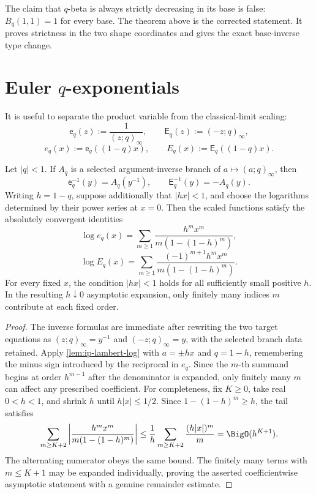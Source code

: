 \begin{warning}
The claim that \(q\)-beta is always strictly decreasing in its base is false:
\(B_q(1,1)=1\) for every base.  The theorem above is the corrected statement.
It proves strictness in the two shape coordinates and gives the exact
base-inverse type change.
\end{warning}

\section{\texorpdfstring{Euler \(q\)-exponentials}{Euler q-exponentials}}
\label{sec:qs-qexponentials}

It is useful to separate the product variable from the classical-limit
scaling:
\[
  \mathsf e_q(z):=\frac1{(z;q)_\infty},
  \qquad
  \mathsf E_q(z):=(-z;q)_\infty,
\]
\[
  e_q(x):=\mathsf e_q((1-q)x),
  \qquad
  E_q(x):=\mathsf E_q((1-q)x).
\]

\begin{proposition}
\label{prop:qs-qexponential}
Let \(|q|<1\).  If \(A_q\) is a selected argument-inverse branch of
\(a\mapsto(a;q)_\infty\), then
\[
  \mathsf e_q^{-1}(y)=A_q(y^{-1}),
  \qquad
  \mathsf E_q^{-1}(y)=-A_q(y).
\]
Writing \(h=1-q\), suppose additionally that \(|hx|<1\), and choose the
logarithms determined by their power series at \(x=0\).  Then the scaled
functions satisfy the absolutely convergent identities
\[
  \log e_q(x)
  =\sum_{m\ge1}\frac{h^m x^m}{m(1-(1-h)^m)},
\]
\[
  \log E_q(x)
  =\sum_{m\ge1}\frac{(-1)^{m+1}h^m x^m}
                       {m(1-(1-h)^m)}.
\]
For every fixed \(x\), the condition \(|hx|<1\) holds for all sufficiently
small positive \(h\).  In the resulting \(h\downarrow0\) asymptotic
expansion, only finitely many indices \(m\) contribute at each fixed order.
\end{proposition}

\begin{proof}
The inverse formulas are immediate after rewriting the two target equations
as \((z;q)_\infty=y^{-1}\) and \((-z;q)_\infty=y\), with the selected branch
data retained.  Apply \cref{lem:ip-lambert-log} with
\(a=\pm hx\) and \(q=1-h\), remembering the minus sign introduced by the
reciprocal in \(e_q\).  Since the \(m\)-th summand begins at order
\(h^{m-1}\) after the denominator is expanded, only finitely many \(m\) can
affect any prescribed coefficient.  For completeness, fix \(K\ge0\), take
real \(0<h<1\), and shrink \(h\) until \(h|x|\le1/2\).  Since
\(1-(1-h)^m\ge h\), the tail satisfies
\[
 \sum_{m\ge K+2}
 \left|\frac{h^mx^m}{m(1-(1-h)^m)}\right|
 \leq\frac1h\sum_{m\ge K+2}\frac{(h|x|)^m}{m}
 =\BigO(h^{K+1}).
\]
The alternating numerator obeys the same bound.  The finitely many terms
with \(m\le K+1\) may be expanded individually, proving the asserted
coefficientwise asymptotic statement with a genuine remainder estimate.
\end{proof}

